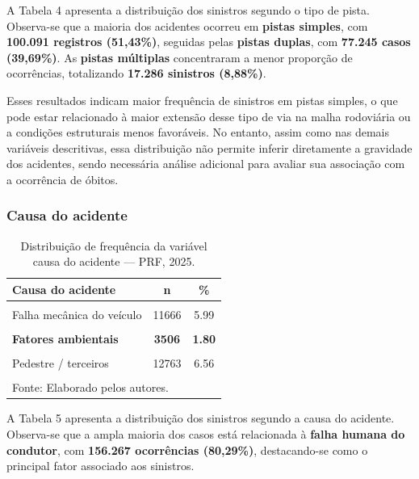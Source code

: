 \documentclass[
  brazilian,
  12pt,
]{article}
\begin{document}
A Tabela 4 apresenta a distribuição dos sinistros segundo o tipo de
pista. Observa-se que a maioria dos acidentes ocorreu em \textbf{pistas
simples}, com \textbf{100.091 registros (51,43\%)}, seguidas pelas
\textbf{pistas duplas}, com \textbf{77.245 casos (39,69\%)}. As
\textbf{pistas múltiplas} concentraram a menor proporção de ocorrências,
totalizando \textbf{17.286 sinistros (8,88\%)}.

Esses resultados indicam maior frequência de sinistros em pistas
simples, o que pode estar relacionado à maior extensão desse tipo de via
na malha rodoviária ou a condições estruturais menos favoráveis. No
entanto, assim como nas demais variáveis descritivas, essa distribuição
não permite inferir diretamente a gravidade dos acidentes, sendo
necessária análise adicional para avaliar sua associação com a
ocorrência de óbitos.

\subsubsection{Causa do acidente}\label{causa-do-acidente}

\begingroup\fontsize{11}{13}\selectfont

\begin{longtable}[t]{lcc}
\caption{\label{tab:tab5}Distribuição de frequência da variável causa do acidente — PRF, 2025.}\\
\toprule
Causa do acidente & n & \%\\
\midrule
\cellcolor{gray!10}{Falha humana do condutor} & \cellcolor{gray!10}{156267} & \cellcolor{gray!10}{80.29}\\
Falha mecânica do veículo & 11666 & 5.99\\
\cellcolor{gray!10}{Falha na via / infraestrutura} & \cellcolor{gray!10}{9693} & \cellcolor{gray!10}{4.98}\\
\textbf{Fatores ambientais} & \textbf{3506} & \textbf{1.80}\\
\cellcolor{gray!10}{Outros} & \cellcolor{gray!10}{727} & \cellcolor{gray!10}{0.37}\\
\addlinespace
Pedestre / terceiros & 12763 & 6.56\\
\cellcolor{gray!10}{Total} & \cellcolor{gray!10}{194622} & \cellcolor{gray!10}{100.00}\\
\bottomrule
\multicolumn{3}{l}{\rule{0pt}{1em}Fonte: Elaborado pelos autores.}\\
\end{longtable}
\endgroup{}

A Tabela 5 apresenta a distribuição dos sinistros segundo a causa do
acidente. Observa-se que a ampla maioria dos casos está relacionada à
\textbf{falha humana do condutor}, com \textbf{156.267 ocorrências
(80,29\%)}, destacando-se como o principal fator associado aos
sinistros.
\end{document}
